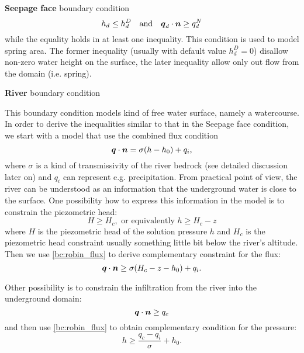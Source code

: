 {\bf Seepage face} boundary condition 
\[
    h_d \le h_d^D\quad \text{and} \quad \mathbf{\boldsymbol{q}}_d \cdot \mathbf{\boldsymbol{n}} \ge q_d^N
\]    
while the equality holds in at least one inequality. This condition is used to model spring area. 
The former inequality
(usually with default value $h_d^D=0$) disallow non-zero water height on the surface, the later
inequality allow only out flow from the domain (i.e. spring).

{\bf River} boundary condition

This boundary condition models kind of free water surface, namely a watercourse.
In order to derive the inequalities similar to that in the Seepage face condition, we
start with a model that use the combined flux condition
\begin{equation}
    \label{bc:robin_flux}
    \vc q \cdot \vc n = \sigma (h - h_0) + q_i,
\end{equation}
where $\sigma$ is a kind of transmissivity of the river bedrock (see detailed discussion later on) and $q_i$ can represent e.g. precipitation.
From practical point of view, the river can be understood as an information that the underground water
is close to the surface. One possibility how to express this information in the model is to constrain the piezometric head:
\[
    H \ge H_c, \text{ or equivalently } h \ge H_c - z
\]
where $H$ is the piezometric head of the solution pressure $h$ and $H_c$ is the piezometric head constraint usually something little bit below
the river's altitude. Then we use \eqref{bc:robin_flux} to derive complementary constraint for the flux:
\[
    \mathbf{\boldsymbol{q}} \cdot \mathbf{\boldsymbol{n}} \ge \sigma(H_c - z - h_0) + q_i.
\]


Other possibility is to constrain the infiltration from the river into the underground domain:
\[
    \mathbf{\boldsymbol{q}} \cdot \mathbf{\boldsymbol{n}} \ge q_c
\]
and then use \eqref{bc:robin_flux} to obtain complementary condition for the pressure:
\[
    h \ge \frac{q_c - q_i}{\sigma} + h_0.
\]



%
%



